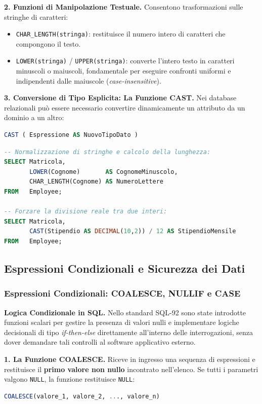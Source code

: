 \documentclass[12pt]{extarticle}
\begin{document}
\medskip
\noindent \textbf{2. Funzioni di Manipolazione Testuale.} Consentono trasformazioni sulle stringhe di caratteri:
\begin{itemize}
    \item \texttt{CHAR\_LENGTH(stringa)}: restituisce il numero intero di caratteri che compongono il testo.
    \item \texttt{LOWER(stringa)} / \texttt{UPPER(stringa)}: converte l'intero testo in caratteri minuscoli o maiuscoli, fondamentale per eseguire confronti uniformi e indipendenti dalle maiuscole (\textit{case-insensitive}).
\end{itemize}

\medskip
\noindent \textbf{3. Conversione di Tipo Esplicita: La Funzione CAST.} Nei database relazionali può essere necessario convertire dinamicamente un attributo da un dominio a un altro:
\begin{lstlisting}[language=SQL]
CAST ( Espressione AS NuovoTipoDato )
\end{lstlisting}

\begin{lstlisting}[language=SQL, caption={Esempi di utilizzo di CAST e funzioni su stringhe}]
-- Normalizzazione di stringhe e calcolo della lunghezza:
SELECT Matricola,
       LOWER(Cognome)       AS CognomeMinuscolo,
       CHAR_LENGTH(Cognome) AS NumeroLettere
FROM   Employee;

-- Forzare la divisione reale tra due interi:
SELECT Matricola,
       CAST(Stipendio AS DECIMAL(10,2)) / 12 AS StipendioMensile
FROM   Employee;
\end{lstlisting}

\subsection{Espressioni Condizionali e Sicurezza dei Dati}

\subsubsection{Espressioni Condizionali: COALESCE, NULLIF e CASE}
\noindent \textbf{Logica Condizionale in SQL.} Nello standard SQL-92 sono state introdotte funzioni scalari per gestire la presenza di valori nulli e implementare logiche decisionali di tipo \textit{if-then-else} direttamente all'interno delle interrogazioni, senza dover demandare tali controlli al software applicativo esterno.

\medskip
\noindent \textbf{1. La Funzione COALESCE.} Riceve in ingresso una sequenza di espressioni e restituisce il \textbf{primo valore non nullo} incontrato nell'elenco. Se tutti i parametri valgono \texttt{NULL}, la funzione restituisce \texttt{NULL}:
\begin{lstlisting}[language=SQL]
COALESCE(valore_1, valore_2, ..., valore_n)
\end{lstlisting}
\end{document}
